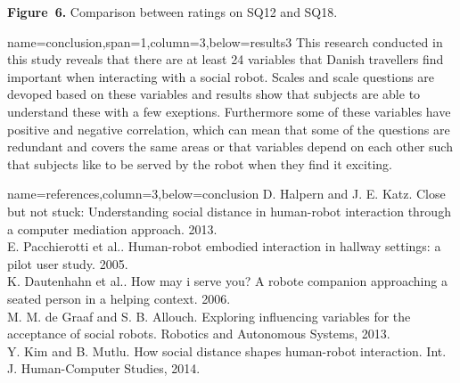 \documentclass[paperwidth=118cm,paperheight=84cm,landscape,fontscale=0.2941]{baposter}
\begin{document}
\begin{poster}
{\textbf{Figure~6. }Comparison between ratings on SQ12 and SQ18.
}

{name=conclusion,span=1,column=3,below=results3}
{\parskip 5pt
This research conducted in this study reveals that there are at least 24 variables that Danish travellers find important when interacting with a social robot. Scales and scale questions are devoped based on these variables and results show that subjects are able to understand these with a few exeptions. Furthermore some of these variables have positive and negative correlation, which can mean that some of the questions are redundant and covers the same areas or that variables depend on each other such that subjects like to be served by the robot when they find it exciting.
}




{name=references,column=3,below=conclusion}
{
\renewcommand{\section}[2]{}%
\footnotesize
\noindent [1] D. Halpern and J. E. Katz. Close but not stuck: Understanding social distance in human-robot interaction through a computer mediation approach. 2013.\\
 
\noindent [2] E. Pacchierotti et al.. Human-robot embodied interaction in hallway settings: a pilot user study. 2005.\\
\vspace{-1pt}
\noindent[3] K. Dautenhahn et al.. How may i serve you? A robote companion approaching a seated person in a helping context. 2006.\\
\vspace{-1pt} 
\noindent [4] M. M. de Graaf and S. B. Allouch. Exploring influencing variables for the acceptance of social robots. Robotics and Autonomous Systems, 2013.\\
\vspace{-1pt}
\noindent [5] Y. Kim and B. Mutlu. How social distance shapes human-robot interaction. Int. J. Human-Computer Studies, 2014.\\

}
\end{poster}
\end{document}
